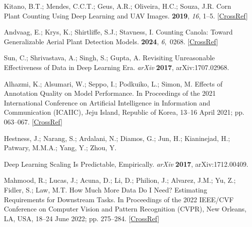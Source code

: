 \documentclass[12pt,a4paper,oneside]{report}
\begin{document}
\begin{thebibliography}{999}
Kitano, B.T.; Mendes, C.C.T.; Geus, A.R.; Oliveira, H.C.; Souza, J.R.
\newblock Corn {{Plant Counting Using Deep Learning}} and {{UAV Images}}.
 {\bf 2019}, {\em 16}, 1--5. [\href{http://dx.doi.org/10.1109/LGRS.2019.2930549}{CrossRef}]

Andvaag, E.; Krys, K.; Shirtliffe, S.J.; Stavness, I.
\newblock Counting {{Canola}}: {{Toward Generalizable Aerial Plant Detection
Models}}.
 {\bf 2024}, {\em 6},~0268. [\href{http://dx.doi.org/10.34133/plantphenomics.0268}{CrossRef}]

Sun, C.; Shrivastava, A.; Singh, S.; Gupta, A.
\newblock Revisiting {{Unreasonable Effectiveness}} of {{Data}} in {{Deep
Learning Era}}. {\em arXiv} {\bf2017}, arXiv:1707.02968. 

Alhazmi, K.; Alsumari, W.; Seppo, I.; Podkuiko, L.; Simon, M.
\newblock Effects of Annotation Quality on Model Performance.
\newblock In Proceedings of the 2021 {{International Conference}} on
{{Artificial Intelligence}} in {{Information}} and {{Communication}}
({{ICAIIC}}), Jeju Island, Republic of Korea, 13--16 April 2021; pp. 063--067. [\href{http://dx.doi.org/10.1109/ICAIIC51459.2021.9415271}{CrossRef}]

Hestness, J.; Narang, S.; Ardalani, N.; Diamos, G.; Jun, H.; Kianinejad, H.;
Patwary, M.M.A.; Yang, Y.; Zhou, Y. 


\newblock Deep {{Learning Scaling}} Is {{Predictable}}, {{Empirically}}. {\em arXiv} {\bf2017}, arXiv:1712.00409. 

Mahmood, R.; Lucas, J.; Acuna, D.; Li, D.; Philion, J.; Alvarez, J.M.; Yu, Z.;
Fidler, S.; Law, M.T.
\newblock How {{Much More Data Do I Need}}? {{Estimating Requirements}} for
{{Downstream Tasks}}.
\newblock In Proceedings of the 2022 {{IEEE}}/{{CVF Conference}} on {{Computer
Vision}} and {{Pattern Recognition}} ({{CVPR}}), New Orleans, LA, USA, 18--24 June 2022; pp. 275--284. [\href{http://dx.doi.org/10.1109/CVPR52688.2022.00037}{CrossRef}]


\end{thebibliography}
\end{document}
